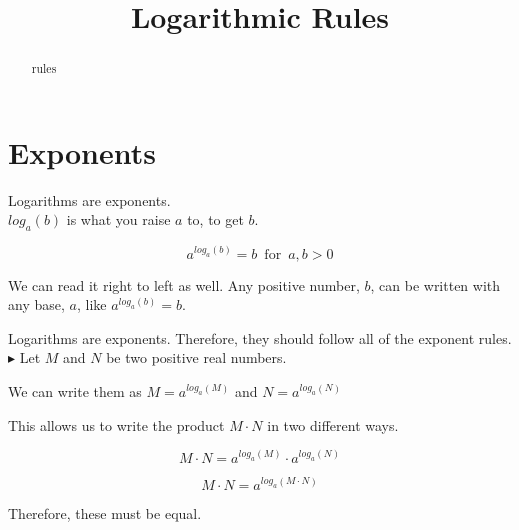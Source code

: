\documentclass{ximera}
\title{Logarithmic Rules}
\begin{document}
\begin{abstract}
rules
\end{abstract}
\maketitle
































\section{Exponents}

Logarithms are exponents. \\


$log_a(b)$ is what you raise $a$ to, to get $b$.

\[    a^{log_a(b)}  = b    \, \text{ for } \,  a,b > 0     \]


We can read it right to left as well.  Any positive number, $b$, can be written with any base, $a$, like $a^{log_a(b)}  = b$.






Logarithms are exponents. Therefore, they should follow all of the exponent rules. \\



$\blacktriangleright$  Let $M$ and $N$ be two positive real numbers.

We can write them as $M = a^{log_a(M)}$ and $N = a^{log_a(N)}$


This allows us to write the product $M \cdot N$ in two different ways.



\[   M \cdot N = a^{log_a(M)} \cdot a^{log_a(N)}                    \]

\[   M \cdot N = a^{log_a(M \cdot N)}                  \]


Therefore, these must be equal.
\end{document}
